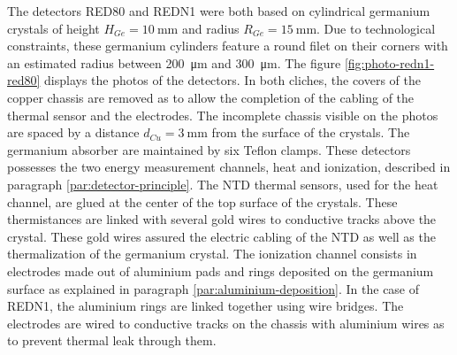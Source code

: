 The detectors RED80 and REDN1 were both based on cylindrical germanium crystals of height $H_{Ge} = \SI{10}{\mm}$ and radius $R_{Ge} = \SI{15}{\mm}$. Due to technological constraints, these germanium cylinders feature a round filet on their corners with an estimated radius between \SI{200}{\micro\metre} and \SI{300}{\micro\metre}. The figure \ref{fig:photo-redn1-red80} displays the photos of the detectors. In both cliches, the covers of the copper chassis are removed as to allow the completion of the cabling of the thermal sensor and the electrodes. The incomplete chassis visible on the photos are spaced by a distance $d_{Cu} = \SI{3}{\mm}$ from the surface of the crystals. The germanium absorber are maintained by six Teflon clamps.
These detectors possesses the two energy measurement channels, heat and ionization, described in paragraph \ref{par:detector-principle}. The NTD thermal sensors, used for the heat channel, are glued at the center of the top surface of the crystals. These thermistances are linked with several gold wires to conductive tracks above the crystal. These gold wires assured the electric cabling of the NTD as well as the thermalization of the germanium crystal. The ionization channel consists in electrodes made out of aluminium pads and rings deposited on the germanium surface as explained in paragraph \ref{par:aluminium-deposition}. In the case of REDN1, the aluminium rings are linked together using wire bridges. The electrodes are wired to conductive tracks on the chassis with aluminium wires as to prevent thermal leak through them.

